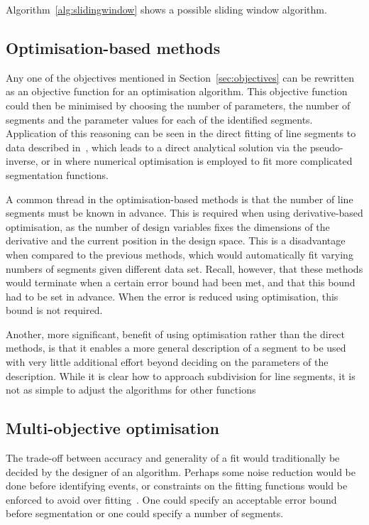 Algorithm~\ref{alg:slidingwindow} shows a possible sliding window
algorithm.

\subsection{Optimisation-based methods}
Any one of the objectives mentioned in Section~\ref{sec:objectives}
can be rewritten as an objective function for an optimisation
algorithm.  This objective function could then be minimised by
choosing the number of parameters, the number of segments and the
parameter values for each of the identified segments.  Application of
this reasoning can be seen in the direct fitting of line segments to
data described in~\citet{cantoni_optimal_1971}, which leads to a direct
analytical solution via the pseudo-inverse, or in where numerical
optimisation is employed to fit more complicated segmentation
functions.

A common thread in the optimisation-based methods is that the number
of line segments must be known in advance.  This is required when
using derivative-based optimisation, as the number of design variables
fixes the dimensions of the derivative and the current position in the
design space.  This is a disadvantage when compared to the previous
methods, which would automatically fit varying numbers of segments
given different data set.  Recall, however, that these methods would
terminate when a certain error bound had been met, and that this bound
had to be set in advance.  When the error is reduced using
optimisation, this bound is not required.

Another, more significant, benefit of using optimisation rather than
the direct methods, is that it enables a more general description of a
segment to be used with very little additional effort beyond deciding
on the parameters of the description.  While it is clear how to
approach subdivision for line segments, it is not as simple to adjust
the algorithms for other functions~\citep{waibel_readings_1990}

\subsection{Multi-objective optimisation}
\label{sec:multi-object-optim}
The trade-off between accuracy and generality of a fit would
traditionally be decided by the designer of an algorithm.  Perhaps
some noise reduction would be done before identifying events, or
constraints on the fitting functions would be enforced to avoid over
fitting~\citep{arora_fitting_2003,punskaya_bayesian_2002}.  One could
specify an acceptable error bound before segmentation or one could
specify a number of segments.

